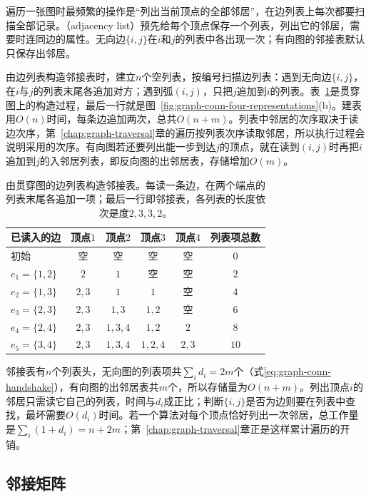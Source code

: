 遍历一张图时最频繁的操作是“列出当前顶点的全部邻居”，在边列表上每次都要扫描全部记录。（adjacency list）预先给每个顶点保存一个列表，列出它的邻居，需要时连同边的属性。无向边$\{i,j\}$在$i$和$j$的列表中各出现一次；有向图的邻接表默认只保存出邻居。

由边列表构造邻接表时，建立$n$个空列表，按编号扫描边列表：遇到无向边$\{i,j\}$，在$i$与$j$的列表末尾各追加对方；遇到弧$(i,j)$，只把$j$追加到$i$的列表。表~\ref{tab:graph-conn-adjacency-list-trace}是贯穿图上的构造过程，最后一行就是图~\ref{fig:graph-conn-four-representations}(b)。建表用$O(n)$时间，每条边追加两次，总共$O(n+m)$。列表中邻居的次序取决于读边次序，第~\ref{chap:graph-traversal}章的遍历按列表次序读取邻居，所以执行过程会说明采用的次序。有向图若还要列出能一步到达$j$的顶点，就在读到$(i,j)$时再把$i$追加到$j$的入邻居列表，即反向图的出邻居表，存储增加$O(m)$。

\begin{table}[!htb]
  \centering
  \caption{由贯穿图的边列表构造邻接表。每读一条边，在两个端点的列表末尾各追加一项；最后一行即邻接表，各列表的长度依次是度$2,3,3,2$。}
  \label{tab:graph-conn-adjacency-list-trace}
  \small
  \begin{tabular}{@{}lccccc@{}}
    \toprule
    已读入的边 & 顶点$1$ & 顶点$2$ & 顶点$3$ & 顶点$4$ & 列表项总数\\
    \midrule
    初始 & 空 & 空 & 空 & 空 & $0$\\
    $e_1=\{1,2\}$ & $2$ & $1$ & 空 & 空 & $2$\\
    $e_2=\{1,3\}$ & $2,3$ & $1$ & $1$ & 空 & $4$\\
    $e_3=\{2,3\}$ & $2,3$ & $1,3$ & $1,2$ & 空 & $6$\\
    $e_4=\{2,4\}$ & $2,3$ & $1,3,4$ & $1,2$ & $2$ & $8$\\
    $e_5=\{3,4\}$ & $2,3$ & $1,3,4$ & $1,2,4$ & $2,3$ & $10$\\
    \bottomrule
  \end{tabular}
\end{table}

邻接表有$n$个列表头，无向图的列表项共$\sum_i d_i=2m$个（式\eqref{eq:graph-conn-handshake}），有向图的出邻居表共$m$个，所以存储量为$O(n+m)$。列出顶点$i$的邻居只需读它自己的列表，时间与$d_i$成正比；判断$\{i,j\}$是否为边则要在列表中查找，最坏需要$O(d_i)$时间。若一个算法对每个顶点恰好列出一次邻居，总工作量是$\sum_i(1+d_i)=n+2m$；第~\ref{chap:graph-traversal}章正是这样累计遍历的开销。

\subsection{邻接矩阵}
\label{sec:graph-conn-adjacency-matrix}


